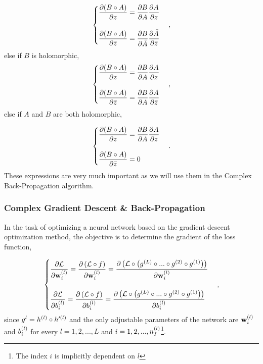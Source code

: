 \begin{equation}
	\begin{cases}
		\dfrac{\partial (B \circ A)}{\partial z} = \dfrac{\partial B}{\partial A}\dfrac{\partial A}{\partial z} \\
		\\
		\dfrac{\partial (B \circ A)}{\partial \bar{z}} = \dfrac{\partial B}{\partial \bar{A}}\dfrac{\partial \bar{A}}{\partial \bar{z}} \\
	\end{cases},
\end{equation}
else if $ B $ is holomorphic,
\begin{equation}
	\begin{cases}
		\dfrac{\partial (B \circ A)}{\partial z} = \dfrac{\partial B}{\partial A}\dfrac{\partial A}{\partial z} \\
		\\
		\dfrac{\partial (B \circ A)}{\partial \bar{z}} = \dfrac{\partial B}{\partial A}\dfrac{\partial A}{\partial \bar{z}} \\
	\end{cases},
	\label{eq:B_holo}
\end{equation}
else if $ A $ and $ B $ are both holomorphic,

\begin{equation}
	\begin{cases}
		\dfrac{\partial (B \circ A)}{\partial z} = \dfrac{\partial B}{\partial A}\dfrac{\partial A}{\partial z} \\
		\\
		\dfrac{\partial (B \circ A)}{\partial \bar{z}} = 0 \\
	\end{cases}.
\end{equation}
These expressions are very much important as we will use them in the Complex Back-Propagation algorithm.

\subsubsection{Complex Gradient Descent \& Back-Propagation}
In the task of optimizing a neural network based on the gradient descent optimization method, the objective is to determine the gradient of the loss function,

\begin{equation}
	\begin{cases}
		\dfrac{\partial \mathcal{L}}{\partial \mathbf{w}^{(l)}_{i}}  = \dfrac{\partial \left( \mathcal{L} \circ f \right)}{\partial \mathbf{w}^{(l)}_{i}} = 
		\dfrac{\partial \left( \mathcal{L} \circ \left( g^{(L)} \circ ... \circ g^{(2)} \circ g^{(1)} \right) \right)}{\partial \mathbf{w}^{(l)}_{i}} \\
		\\
		\dfrac{\partial \mathcal{L}}{\partial b^{(l)}_{i}}  = \dfrac{\partial \left( \mathcal{L} \circ f \right)}{\partial b^{(l)}_{i}} = 
		\dfrac{\partial \left( \mathcal{L} \circ \left( g^{(L)} \circ ... \circ g^{(2)} \circ g^{(1)} \right) \right)}{\partial b^{(l)}_{i}} \\
	\end{cases},
\end{equation}
since $ g^{l} = h^{(l)} \circ h'^{(l)} $ and the only adjustable parameters of the network are $ \mathbf{w}^{(l)}_{i} $ and $ b^{(l)}_{i} $ for every $ l = 1, 2, ..., L $ and $ i = 1, 2, ..., n^{(l)}_{I} $\footnote{The index $ i $ is implicitly dependent on $ l $}.

